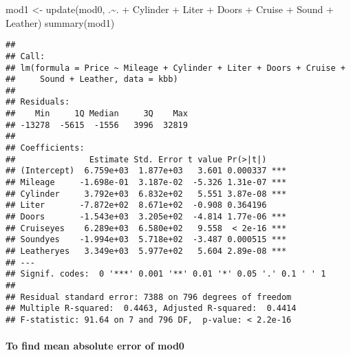 \documentclass[
]{article}
\newenvironment{Shaded}{\begin{snugshade}}{\end{snugshade}}
\newcommand{\FunctionTok}[1]{\textcolor[rgb]{0.00,0.00,0.00}{#1}}
\newcommand{\NormalTok}[1]{#1}
\newcommand{\OtherTok}[1]{\textcolor[rgb]{0.56,0.35,0.01}{#1}}
\newcommand{\SpecialCharTok}[1]{\textcolor[rgb]{0.00,0.00,0.00}{#1}}
\begin{document}
\begin{Shaded}
\begin{Highlighting}[]
\NormalTok{mod1 }\OtherTok{\textless{}{-}} \FunctionTok{update}\NormalTok{(mod0, .}\SpecialCharTok{\textasciitilde{}}\NormalTok{. }\SpecialCharTok{+}\NormalTok{ Cylinder }\SpecialCharTok{+}\NormalTok{ Liter }\SpecialCharTok{+}\NormalTok{ Doors }\SpecialCharTok{+}\NormalTok{ Cruise }\SpecialCharTok{+}\NormalTok{ Sound }\SpecialCharTok{+}\NormalTok{ Leather)}
\FunctionTok{summary}\NormalTok{(mod1)}
\end{Highlighting}
\end{Shaded}

\begin{verbatim}
## 
## Call:
## lm(formula = Price ~ Mileage + Cylinder + Liter + Doors + Cruise + 
##     Sound + Leather, data = kbb)
## 
## Residuals:
##    Min     1Q Median     3Q    Max 
## -13278  -5615  -1556   3996  32819 
## 
## Coefficients:
##               Estimate Std. Error t value Pr(>|t|)    
## (Intercept)  6.759e+03  1.877e+03   3.601 0.000337 ***
## Mileage     -1.698e-01  3.187e-02  -5.326 1.31e-07 ***
## Cylinder     3.792e+03  6.832e+02   5.551 3.87e-08 ***
## Liter       -7.872e+02  8.671e+02  -0.908 0.364196    
## Doors       -1.543e+03  3.205e+02  -4.814 1.77e-06 ***
## Cruiseyes    6.289e+03  6.580e+02   9.558  < 2e-16 ***
## Soundyes    -1.994e+03  5.718e+02  -3.487 0.000515 ***
## Leatheryes   3.349e+03  5.977e+02   5.604 2.89e-08 ***
## ---
## Signif. codes:  0 '***' 0.001 '**' 0.01 '*' 0.05 '.' 0.1 ' ' 1
## 
## Residual standard error: 7388 on 796 degrees of freedom
## Multiple R-squared:  0.4463, Adjusted R-squared:  0.4414 
## F-statistic: 91.64 on 7 and 796 DF,  p-value: < 2.2e-16
\end{verbatim}

\hypertarget{to-find-mean-absolute-error-of-mod0-1}{%
\paragraph{To find mean absolute error of
mod0}\label{to-find-mean-absolute-error-of-mod0-1}}

\begin{Shaded}
\end{Shaded}
\end{document}
